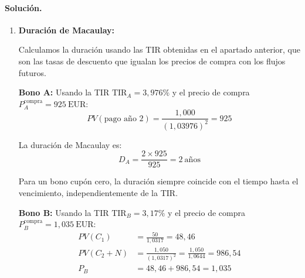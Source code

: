 \documentclass[12pt,a4paper]{article}
\newcommand{\EUR}[1]{\ensuremath{#1~\text{EUR}}}
\newenvironment{solucion}{\paragraph{Solución.}}{}
\begin{document}
\begin{solucion}
\begin{enumerate}[label=\alph*)]
   Multiplicando ambos lados por \((1+\text{TIR}_B)^2\):
   \[
   1{,}035(1+\text{TIR}_B)^2 = 50(1+\text{TIR}_B) + 1{,}050
   \]
   
   Haciendo el cambio de variable \(x = 1+\text{TIR}_B\):
   \[
   1{,}035x^2 - 50x - 1{,}050 = 0
   \]
   
   Resolviendo la ecuación cuadrática con \(a = 1{,}035\), \(b = -50\), \(c = -1{,}050\):
   \[
   \Delta = 50^2 + 4(1{,}035)(1{,}050) = 2{,}500 + 4{,}347{,}000 = 4{,}349{,}500
   \]
   \[
   \sqrt{\Delta} = \sqrt{4{,}349{,}500} = 2{,}085{,}55
   \]
   \[
   x = \frac{50 + 2{,}085{,}55}{2{,}070} = \frac{2{,}135{,}55}{2{,}070} = 1{,}0317
   \]
   
   (Descartamos la raíz negativa porque \(x = 1+\text{TIR}_B > 0\)).
   
   Por tanto, \(\text{TIR}_B = 1{,}0317 - 1 = 3{,}17\%\). 
   
   \textbf{Comentario:} La TIR (3{,}17\%) es menor que el cupón del \(5\%\) porque el precio de compra está por encima del nominal (\EUR{1{,}035} > \EUR{1{,}000}). Además, la TIR es menor que una tasa promedio ponderada de los tipos spot porque el precio de compra (\EUR{1{,}035}) es superior al precio teórico calculado con la curva spot (\EUR{1{,}028{,}72}), lo que reduce la rentabilidad efectiva para el inversor.
   
   \item \textbf{Duración de Macaulay:}
   
   Calculamos la duración usando las TIR obtenidas en el apartado anterior, que son las tasas de descuento que igualan los precios de compra con los flujos futuros.
   
   \textbf{Bono A:} Usando la TIR \(\text{TIR}_A = 3{,}976\%\) y el precio de compra \(P_A^{\text{compra}} = \EUR{925}\):
   \[
   PV(\text{pago año 2}) = \frac{1{,}000}{(1{,}03976)^2} = 925
   \]
   
   La duración de Macaulay es:
   \[
   D_A = \frac{2 \times 925}{925} = 2\ \text{años}
   \]
   
   Para un bono cupón cero, la duración siempre coincide con el tiempo hasta el vencimiento, independientemente de la TIR.
   
   \textbf{Bono B:} Usando la TIR \(\text{TIR}_B = 3{,}17\%\) y el precio de compra \(P_B^{\text{compra}} = \EUR{1{,}035}\):
   \begin{align*}
   PV(C_1) &= \frac{50}{1{,}0317} = 48{,}46\\
   PV(C_2+N) &= \frac{1{,}050}{(1{,}0317)^2} = \frac{1{,}050}{1{,}0644} = 986{,}54\\
   P_B &= 48{,}46 + 986{,}54 = 1{,}035
   \end{align*}
   

\end{enumerate}
\end{solucion}
\end{document}
